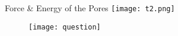 \documentclass[UTF8]{ctexbeamer}
\begin{document}
\begin{frame}{Force \& Energy of the Pores}
\centering
\texttt{[image: t2.png]}
\end{frame}


\begin{frame}{}
	\vspace{1cm}
	\centering {\Huge \textbf{\color[rgb]{0.0, 0.72, 0.92}{Thank you for your time!}}}
	\begin{figure}[htbp]
	\centering
	\texttt{[image: question]}
	\end{figure}
\end{frame}
\end{document}
